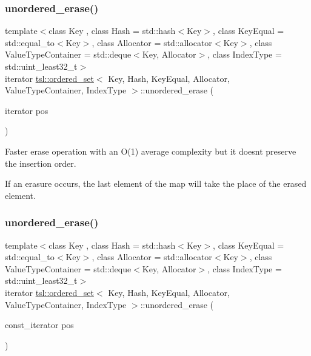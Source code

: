 \subsubsection{\texorpdfstring{unordered\_erase()}{unordered\_erase()}\hspace{0.1cm}{\footnotesize\ttfamily [1/6]}}
{\footnotesize\ttfamily template$<$class Key , class Hash  = std\+::hash$<$\+Key$>$, class Key\+Equal  = std\+::equal\+\_\+to$<$\+Key$>$, class Allocator  = std\+::allocator$<$\+Key$>$, class Value\+Type\+Container  = std\+::deque$<$\+Key, Allocator$>$, class Index\+Type  = std\+::uint\+\_\+least32\+\_\+t$>$ \\
iterator \mbox{\hyperlink{classtsl_1_1ordered__set}{tsl\+::ordered\+\_\+set}}$<$ Key, Hash, Key\+Equal, Allocator, Value\+Type\+Container, Index\+Type $>$\+::unordered\+\_\+erase (\begin{DoxyParamCaption}\item[{iterator}]{pos }\end{DoxyParamCaption})\hspace{0.3cm}{\ttfamily [inline]}}

Faster erase operation with an O(1) average complexity but it doesn\textquotesingle{}t preserve the insertion order.

If an erasure occurs, the last element of the map will take the place of the erased element. \mbox{\label{classtsl_1_1ordered__set_a4c0e19fd5e5e8832c522b6f876d2a7f9}} 
\subsubsection{\texorpdfstring{unordered\_erase()}{unordered\_erase()}\hspace{0.1cm}{\footnotesize\ttfamily [2/6]}}
{\footnotesize\ttfamily template$<$class Key , class Hash  = std\+::hash$<$\+Key$>$, class Key\+Equal  = std\+::equal\+\_\+to$<$\+Key$>$, class Allocator  = std\+::allocator$<$\+Key$>$, class Value\+Type\+Container  = std\+::deque$<$\+Key, Allocator$>$, class Index\+Type  = std\+::uint\+\_\+least32\+\_\+t$>$ \\
iterator \mbox{\hyperlink{classtsl_1_1ordered__set}{tsl\+::ordered\+\_\+set}}$<$ Key, Hash, Key\+Equal, Allocator, Value\+Type\+Container, Index\+Type $>$\+::unordered\+\_\+erase (\begin{DoxyParamCaption}\item[{const\+\_\+iterator}]{pos }\end{DoxyParamCaption})\hspace{0.3cm}{\ttfamily [inline]}}





